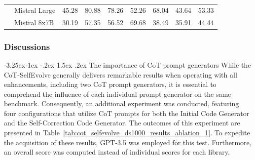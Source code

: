 \documentclass[a4paper,oneside]{book}
\makeatletter
\newcounter {subsubsubsection}[subsubsection]
\newcommand\subsubsubsection{\@startsection{subsubsubsection}{4}{\z@}%
                                    {-3.25ex\@plus -1ex \@minus -.2ex}%
                                    {1.5ex \@plus .2ex}%
                                    {\normalfont\normalsize\bfseries}}
\makeatother
\begin{document}
\begin{table}[H]
{\begin{tabular}{|l|l|c|c|c|c|c|c|c|}
                                                     & Mistral Large & 45.28                      & 80.88                        & 78.26                        & 52.26                           & 68.04                       & 43.64                      & 53.33                           \\ \cline{2-9}
                                                     & Mistral 8x7B  & 30.19                      & 57.35                        & 56.52                        & 69.68                           & 38.49                       & 35.91                      & 44.44                           \\ \hline
        \end{tabular}%
    }
\end{table}

\subsubsection{Discussions}
\subsubsubsection{The importance of CoT prompt generators}
While the CoT-SelfEvolve generally delivers remarkable results when operating with all enhancements, including two CoT prompt generators, it is essential to comprehend the influence of each individual prompt generator on the same benchmark. Consequently, an additional experiment was conducted, featuring four configurations that utilize CoT prompts for both the Initial Code Generator and the Self-Correction Code Generator. The outcomes of this experiment are presented in Table~\ref{tab:cot_selfevolve_ds1000_results_ablation_1}. To expedite the acquisition of these results, GPT-3.5 was employed for this test. Furthermore, an overall score was computed instead of individual scores for each library.
\end{document}
